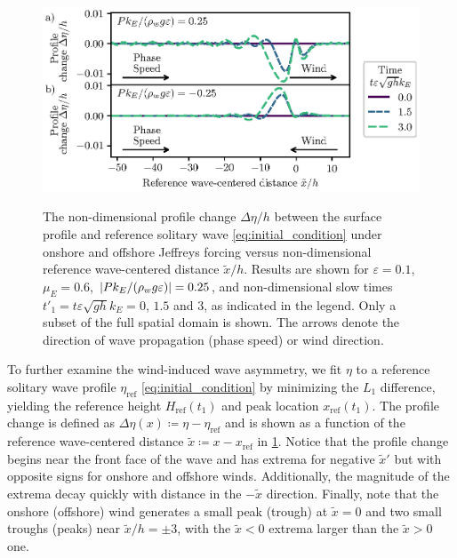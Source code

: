 \documentclass{jfm}
\renewcommand*{\epsilon}{\varepsilon}
\begin{document}
\begin{figure}
  \centering
  { %
    \label{fig:snapshots_solitary_tail:a}
    \label{fig:snapshots_solitary_tail:b}
  }
  \includegraphics{Snapshots-Positive-Negative-Tail.eps}
  \vspace{-0.25cm}
  \caption{
    The non-dimensional profile change $\Delta \eta/h$ between the
    surface profile and reference solitary wave
    \cref{eq:initial_condition} under
     onshore and
     offshore Jeffreys forcing
    versus non-dimensional reference wave-centered distance
    $\tilde{x}/h$.
    Results are shown for $\epsilon=0.1$, $\mu_E = 0.6$, $\abs{P
    k_E/(\rho_w g \epsilon)} = 0.25$, and non-dimensional slow times
    $t'_1 = t \epsilon \sqrt{gh} k_E = 0$, $1.5$ and $3$, as indicated
    in the legend.
    Only a subset of the full spatial domain is shown.
    The arrows denote the direction of wave propagation (phase speed) or
    wind direction.
  }\label{fig:snapshots_solitary_tail}
\end{figure}

To further examine the wind-induced wave asymmetry, we fit $\eta$ to a
reference solitary wave profile $\eta_{\text{ref}}$
\cref{eq:initial_condition} by minimizing the $L_1$ difference, yielding
the reference height $H_{\text{ref}}(t_1)$ and peak location
$x_{\text{ref}}(t_1)$.
The profile change is defined as $\Delta \eta(x) \coloneqq \eta -
\eta_{\text{ref}}$ and is shown as a function of the reference
wave-centered distance $\tilde{x} \coloneqq x - x_{\text{ref}}$ in
\cref{fig:snapshots_solitary_tail}.
Notice that the profile change begins near the front face of the wave
and has extrema for negative $\tilde{x}'$ but with opposite signs for
onshore and offshore winds.
Additionally, the magnitude of the extrema decay quickly with distance
in the $-\tilde{x}$ direction.
Finally, note that the onshore (offshore) wind generates a small peak
(trough) at $\tilde{x} = 0$ and two small troughs (peaks) near
$\tilde{x}/h = \pm 3$, with the $\tilde{x}<0$ extrema larger than the
$\tilde{x}>0$ one.
\end{document}
